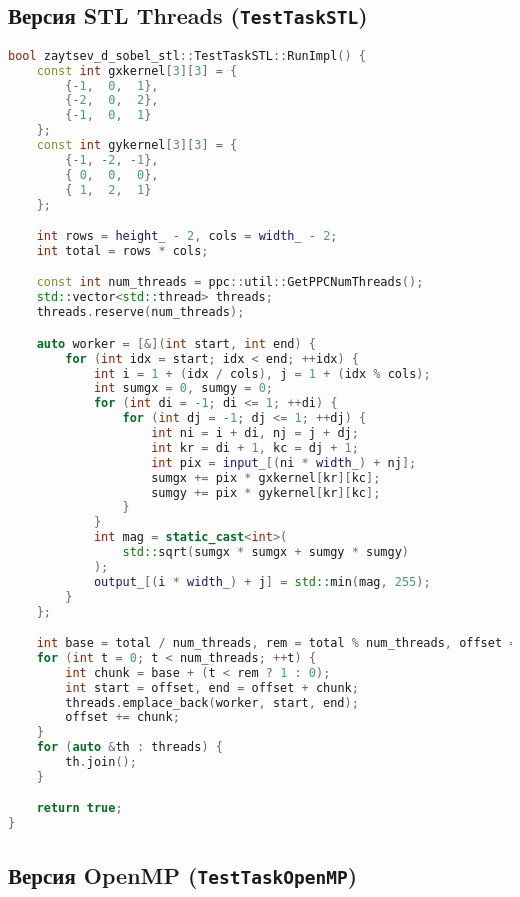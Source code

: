 \documentclass[12pt]{article}
\begin{document}
\subsection{Версия STL Threads (\texttt{TestTaskSTL})}

\begin{lstlisting}[language=C++, caption={Параллельная реализация с STL-потоками}]
bool zaytsev_d_sobel_stl::TestTaskSTL::RunImpl() {
    const int gxkernel[3][3] = {
        {-1,  0,  1},
        {-2,  0,  2},
        {-1,  0,  1}
    };
    const int gykernel[3][3] = {
        {-1, -2, -1},
        { 0,  0,  0},
        { 1,  2,  1}
    };

    int rows = height_ - 2, cols = width_ - 2;
    int total = rows * cols;

    const int num_threads = ppc::util::GetPPCNumThreads();
    std::vector<std::thread> threads;
    threads.reserve(num_threads);

    auto worker = [&](int start, int end) {
        for (int idx = start; idx < end; ++idx) {
            int i = 1 + (idx / cols), j = 1 + (idx % cols);
            int sumgx = 0, sumgy = 0;
            for (int di = -1; di <= 1; ++di) {
                for (int dj = -1; dj <= 1; ++dj) {
                    int ni = i + di, nj = j + dj;
                    int kr = di + 1, kc = dj + 1;
                    int pix = input_[(ni * width_) + nj];
                    sumgx += pix * gxkernel[kr][kc];
                    sumgy += pix * gykernel[kr][kc];
                }
            }
            int mag = static_cast<int>(
                std::sqrt(sumgx * sumgx + sumgy * sumgy)
            );
            output_[(i * width_) + j] = std::min(mag, 255);
        }
    };

    int base = total / num_threads, rem = total % num_threads, offset = 0;
    for (int t = 0; t < num_threads; ++t) {
        int chunk = base + (t < rem ? 1 : 0);
        int start = offset, end = offset + chunk;
        threads.emplace_back(worker, start, end);
        offset += chunk;
    }
    for (auto &th : threads) {
        th.join();
    }

    return true;
}
\end{lstlisting}

\subsection{Версия OpenMP (\texttt{TestTaskOpenMP})}
\end{document}
